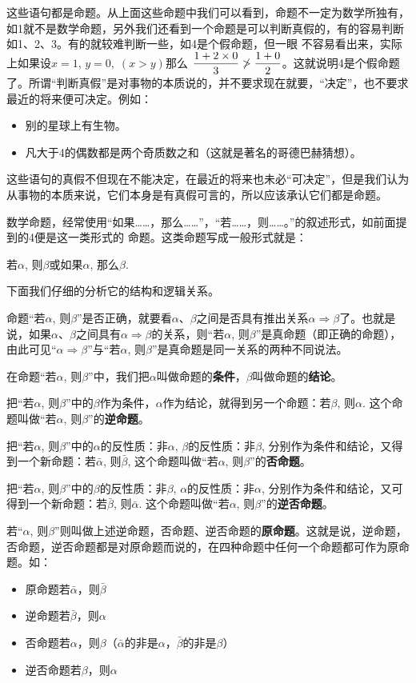 这些语句都是命题。从上面这些命题中我们可以看到，命题不一定为数学所独有，如1就不是数学命题，另外我们还看到一个命题是可以判断真假的，有的容易判断如1、2、3。有的就较难判断一些，如4是个假命题，但一眼
不容易看出来，实际上如果设$x=1$, $y=0,\;(x>y)$那么
$\dfrac{1+2\times 0}{3}\not>\dfrac{1+0}{2}$。这就说明4是个假命题了。所谓“判断真假”是对事物的本质说的，并不要求现在就要，“决定”，也不要求最近的将来便可决定。例如：
\begin{itemize}
	\item 别的星球上有生物。
	\item 凡大于4的偶数都是两个奇质数之和（这就是著名的哥德巴赫猜想）。
\end{itemize}

这些语句的真假不但现在不能决定，在最近的将来也未必“可决定”，但是我们认为从事物的本质来说，它们本身是有真假可言的，所以应该承认它们都是命题。

数学命题，经常使用“如果……，那么……”，“若……，则……。”的叙述形式，如前面提到的4便是这一类形式的
命题。这类命题写成一般形式就是：
\begin{blk}{}
	若$\alpha$, 则$\beta$\qquad 或\qquad  如果$\alpha$, 那么$\beta$.
\end{blk}

下面我们仔细的分析它的结构和逻辑关系。

命题“若$\alpha$, 则$\beta$”是否正确，就要看$\alpha$、$\beta$之间是否具有推出关系$\alpha\Rightarrow\beta$了。也就是说，如果$\alpha$、$\beta$之间具有$\alpha\Rightarrow\beta$的关系，则“若$\alpha$, 则$\beta$”是真命题（即正确的命题），由此可见“$\alpha\Rightarrow\beta$”与“若$\alpha$, 则$\beta$”是真命题是同一关系的两种不同说法。

在命题“若$\alpha$, 则$\beta$”中，我们把$\alpha$叫做命题的\textbf{条件}，$\beta$叫做命题的\textbf{结论}。

把“若$\alpha$, 则$\beta$”中的$\beta$作为条件，$\alpha$作为结论，就得到另一个命题：若$\beta$, 则$\alpha$. 这个命题叫做“若$\alpha$, 则$\beta$”的\textbf{逆命题}。

把“若$\alpha$, 则$\beta$”中的$\alpha$的反性质：非$\alpha$, $\beta$的反性质：非$\beta$, 分别作为条件和结论，又得到一个新命题：若$\bar\alpha$, 则$\bar\beta$, 这个命题叫做“若$\alpha$, 则$\beta$”的\textbf{否命题}。

把“若$\alpha$, 则$\beta$”中的$\beta$的反性质：非$\beta$, $\alpha$的反性质：非$\alpha$, 分别作为条件和结论，又可得到一个新命题：若$\bar\beta$, 则$\bar\alpha$. 这个命题叫做“若$\alpha$, 则$\beta$”的\textbf{逆否命题}。

若“$\alpha$, 则$\beta$”则叫做上述逆命题，否命题、逆否命题的\textbf{原命题}。这就是说，逆命题，否命题，逆否命题都是对原命题而说的，在四种命题中任何一个命题都可作为原命题。如：
\begin{itemize}
	\item 原命题\quad 若$\bar\alpha$，则$\bar\beta$
	\item 逆命题\quad 若$\bar\beta$，则$\alpha$
	\item 否命题\quad 若$\alpha$，则$\beta$（$\bar\alpha$的非是$\alpha$，$\bar\beta$的非是$\beta$）
	\item 逆否命题\quad 若$\beta$，则$\alpha$
\end{itemize}

